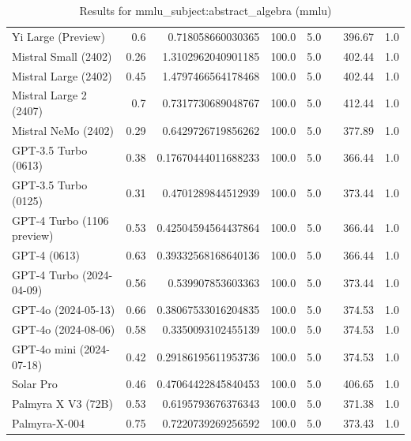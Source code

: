 \begin{table}[htp]
{\begin{tabular}{lrrrrrrr}
Yi Large (Preview) & 0.6 & 0.718058660030365 & 100.0 & 5.0 &  & 396.67 & 1.0 \\
Mistral Small (2402) & 0.26 & 1.3102962040901185 & 100.0 & 5.0 &  & 402.44 & 1.0 \\
Mistral Large (2402) & 0.45 & 1.4797466564178468 & 100.0 & 5.0 &  & 402.44 & 1.0 \\
Mistral Large 2 (2407) & 0.7 & 0.7317730689048767 & 100.0 & 5.0 &  & 412.44 & 1.0 \\
Mistral NeMo (2402) & 0.29 & 0.6429726719856262 & 100.0 & 5.0 &  & 377.89 & 1.0 \\
GPT-3.5 Turbo (0613) & 0.38 & 0.17670444011688233 & 100.0 & 5.0 &  & 366.44 & 1.0 \\
GPT-3.5 Turbo (0125) & 0.31 & 0.4701289844512939 & 100.0 & 5.0 &  & 373.44 & 1.0 \\
GPT-4 Turbo (1106 preview) & 0.53 & 0.42504594564437864 & 100.0 & 5.0 &  & 366.44 & 1.0 \\
GPT-4 (0613) & 0.63 & 0.39332568168640136 & 100.0 & 5.0 &  & 366.44 & 1.0 \\
GPT-4 Turbo (2024-04-09) & 0.56 & 0.539907853603363 & 100.0 & 5.0 &  & 373.44 & 1.0 \\
GPT-4o (2024-05-13) & 0.66 & 0.38067533016204835 & 100.0 & 5.0 &  & 374.53 & 1.0 \\
GPT-4o (2024-08-06) & 0.58 & 0.3350093102455139 & 100.0 & 5.0 &  & 374.53 & 1.0 \\
GPT-4o mini (2024-07-18) & 0.42 & 0.29186195611953736 & 100.0 & 5.0 &  & 374.53 & 1.0 \\
Solar Pro & 0.46 & 0.47064422845840453 & 100.0 & 5.0 &  & 406.65 & 1.0 \\
Palmyra X V3 (72B) & 0.53 & 0.6195793676376343 & 100.0 & 5.0 &  & 371.38 & 1.0 \\
Palmyra-X-004 & 0.75 & 0.7220739269256592 & 100.0 & 5.0 &  & 373.43 & 1.0 \\
\bottomrule
\end{tabular}}
\caption{Results for mmlu_subject:abstract_algebra (mmlu)}
\label{fig:mmlu_subject:abstract_algebra (mmlu)}
\end{table}